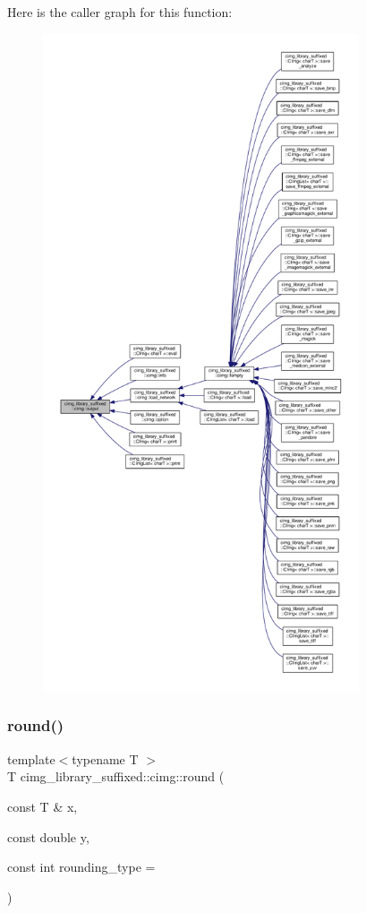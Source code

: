 Here is the caller graph for this function\+:
\nopagebreak
\begin{figure}[H]
\begin{center}
\leavevmode
\includegraphics[height=550pt]{d4/d9b/namespacecimg__library__suffixed_1_1cimg_ada686776cc71803df391eea79cd1b3e5_icgraph}
\end{center}
\end{figure}
\mbox{\label{namespacecimg__library__suffixed_1_1cimg_a66a32585b286a3c7f76d745107ae5300}} 
\subsubsection{\texorpdfstring{round()}{round()}}
{\footnotesize\ttfamily template$<$typename T $>$ \\
T cimg\+\_\+library\+\_\+suffixed\+::cimg\+::round (\begin{DoxyParamCaption}\item[{const T \&}]{x,  }\item[{const double}]{y,  }\item[{const int}]{rounding\+\_\+type = {} }\end{DoxyParamCaption})\hspace{0.3cm}{\ttfamily [inline]}}



